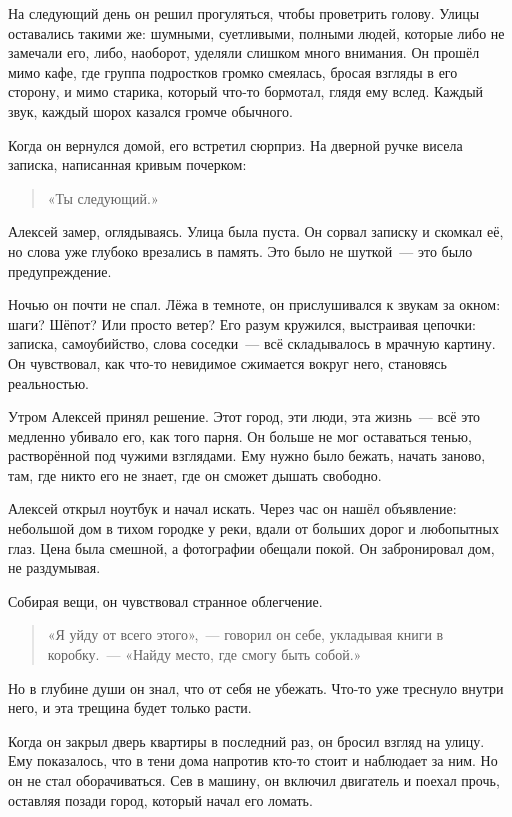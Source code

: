 \documentclass[12pt,a4paper]{book}
\begin{document}
На следующий день он решил прогуляться, чтобы проветрить голову. Улицы оставались такими же: шумными, суетливыми, полными людей, которые либо не замечали его, либо, наоборот, уделяли слишком много внимания. Он прошёл мимо кафе, где группа подростков громко смеялась, бросая взгляды в его сторону, и мимо старика, который что-то бормотал, глядя ему вслед. Каждый звук, каждый шорох казался громче обычного.

Когда он вернулся домой, его встретил сюрприз. На дверной ручке висела записка, написанная кривым почерком:
\begin{quote}
«Ты следующий.»
\end{quote}

Алексей замер, оглядываясь. Улица была пуста. Он сорвал записку и скомкал её, но слова уже глубоко врезались в память. Это было не шуткой~--- это было предупреждение.

Ночью он почти не спал. Лёжа в темноте, он прислушивался к звукам за окном: шаги? Шёпот? Или просто ветер? Его разум кружился, выстраивая цепочки: записка, самоубийство, слова соседки~--- всё складывалось в мрачную картину. Он чувствовал, как что-то невидимое сжимается вокруг него, становясь реальностью.

Утром Алексей принял решение. Этот город, эти люди, эта жизнь~--- всё это медленно убивало его, как того парня. Он больше не мог оставаться тенью, растворённой под чужими взглядами. Ему нужно было бежать, начать заново, там, где никто его не знает, где он сможет дышать свободно.

Алексей открыл ноутбук и начал искать. Через час он нашёл объявление: небольшой дом в тихом городке у реки, вдали от больших дорог и любопытных глаз. Цена была смешной, а фотографии обещали покой. Он забронировал дом, не раздумывая.

Собирая вещи, он чувствовал странное облегчение.
\begin{quote}
«Я уйду от всего этого»,~--- говорил он себе, укладывая книги в коробку.~--- «Найду место, где смогу быть собой.»
\end{quote}
Но в глубине души он знал, что от себя не убежать. Что-то уже треснуло внутри него, и эта трещина будет только расти.

Когда он закрыл дверь квартиры в последний раз, он бросил взгляд на улицу. Ему показалось, что в тени дома напротив кто-то стоит и наблюдает за ним. Но он не стал оборачиваться. Сев в машину, он включил двигатель и поехал прочь, оставляя позади город, который начал его ломать.
\end{document}
